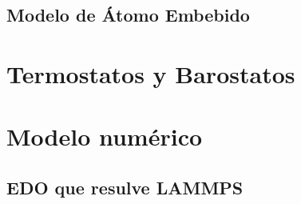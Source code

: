 \subsection{Modelo de Átomo Embebido}
\label{SS2_3_2}



\section{Termostatos y Barostatos}
\label{S2_4}


\section{Modelo numérico}
\label{S2_5}



\subsection{EDO que resulve LAMMPS}
\label{S2_5_1}